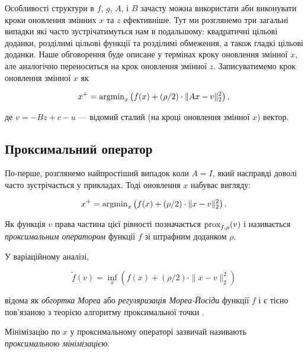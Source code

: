 Особливості структури в $f$, $g$, $A$, і $B$ зачасту можна використати аби виконувати кроки оновлення змінних $x$ та $z$ ефективніше. Тут ми розглянемо три загальні випадки які часто зустрічатимуться нам в подальшому: квадратичні цільові доданки, розділимі цільові функції та розділимі обмеження, а також гладкі цільові доданки. Наше обговорення буде описане у термінах кроку оновлення змінної $x$, але аналогічно переноситься на крок оновлення змінної $z$. Записуватимемо крок оновлення змінної $x$ як

\begin{equation}
	x^+ = \operatorname{argmin}_x \left(f(x) + (\rho / 2) \cdot \|A x - v\|_2^2\right),
\end{equation}

де $v = - B z + c - u$ --- відомий сталий (на кроці оновлення змінної $x$) 
вектор.

\subsection{Проксимальний оператор}

По-перше, розглянемо найпростіший випадок коли $A = I$, який насправді
доволі часто зустрічається у прикладах. Тоді оновлення $x$ набуває вигляду:

\begin{equation}
	x^+ = \operatorname{argmin}_x \left(f(x) + (\rho / 2) \cdot \|x - v\|_2^2\right).
\end{equation}

\begin{definition}
	Як функція $v$ права частина цієї рівності позначається $\operatorname{prox}_{f,\rho}(v)$ і називається \textit{проксимальним оператором} функції $f$ зі штрафним доданком $\rho$\cite{127}.
\end{definition}

\begin{definition}
	У варіаційному аналізі,
	
	\begin{equation}
		\tilde f(v) = \inf_x \left(f(x) + (\rho / 2) \cdot \|x - v\|_2^2\right)
	\end{equation}
	
	відома як \textit{обгортка Мореа} або \textit{регуляризація Мореа-Йосіди} функції $f$ і є тісно пов'язаною з теорією алгоритму проксимальної точки \cite{144}.
\end{definition}

\begin{definition}
	Мінімізацію по $x$ у проксимальному операторі зазвичай називають \textit{проксимальною мінімізацією}. 
\end{definition}

